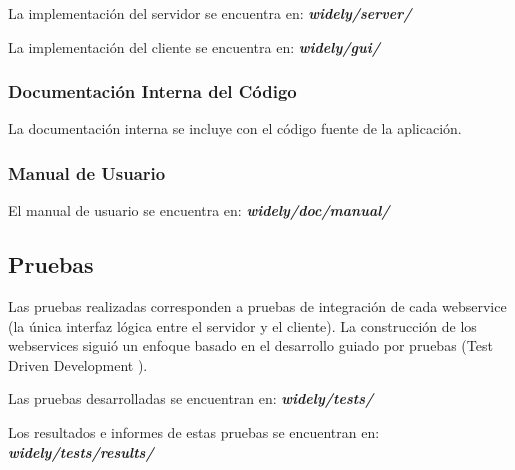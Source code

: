 La implementación del servidor se encuentra en: \textit{\textbf{widely/server/}}

La implementación del cliente se encuentra en: \textit{\textbf{widely/gui/}}


\subsubsection{Documentación Interna del Código}

La documentación interna se incluye con el código fuente de la aplicación.


\subsubsection{Manual de Usuario}

El manual de usuario se encuentra en: \textit{\textbf{widely/doc/manual/}}


\subsection{Pruebas}

Las pruebas realizadas corresponden a pruebas de integración de cada webservice (la única interfaz lógica entre el servidor y el cliente). La construcción de los webservices siguió un enfoque basado en el desarrollo guiado por pruebas (Test Driven Development \cite{tdd}).


Las pruebas desarrolladas se encuentran en: \textit{\textbf{widely/tests/}}

Los resultados e informes de estas pruebas se encuentran en: \textit{\textbf{widely/tests/results/}}


